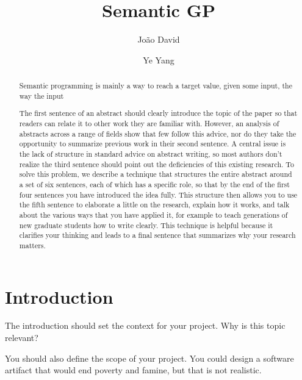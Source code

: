 \documentclass[runningheads]{llncs}
\begin{document}
\title{Semantic GP}
\author{João David \and
Ye Yang
}


\maketitle

\begin{abstract}
Semantic programming is mainly a way to reach a target value, given some input, the way the input 


The first sentence of an abstract should clearly introduce the topic of the paper so that readers can relate it to other work they are familiar with. However, an analysis of abstracts across a range of fields show that few follow this advice, nor do they take the opportunity to summarize previous work in their second sentence. A central issue is the lack of structure in standard advice on abstract writing, so most authors don’t realize the third sentence should point out the deficiencies of this existing research. To solve this problem, we describe a technique that structures the entire abstract around a set of six sentences, each of which has a specific role, so that by the end of the first four sentences you have introduced the idea fully. This structure then allows you to use the fifth sentence to elaborate a little on the research, explain how it works, and talk about the various ways that you have applied it, for example to teach generations of new graduate students how to write clearly. This technique is helpful because it clarifies your thinking and leads to a final sentence that summarizes why your research matters.

\end{abstract}
%
%
%
\section{Introduction}


The introduction should set the context for your project. Why is this topic relevant?

You should also define the scope of your project. You could design a software artifact that would end poverty and famine, but that is not realistic.
\end{document}
